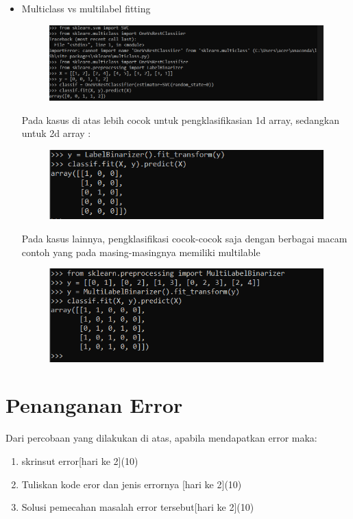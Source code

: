 \begin{enumerate}
\begin{itemize}
\begin{figure}[!htbp]
        \label{Figure}
        \end{figure}
        \newpage
        \item Multiclass vs multilabel fitting
         \begin{figure}[!htbp]
        \centering
        \includegraphics[scale=0.7]{figures/Conventions/11.PNG}
        \label{Figure}
        \end{figure}
        \par
        Pada kasus di atas lebih cocok untuk pengklasifikasian 1d array, sedangkan untuk 2d array :
         \begin{figure}[!htbp]
        \centering
        \includegraphics[scale=1]{figures/Conventions/12.PNG}
        \label{Figure}
        \end{figure}
        \par
        Pada kasus lainnya, pengklasifikasi cocok-cocok saja dengan berbagai macam contoh yang pada masing-masingnya memiliki multilable
        \begin{figure}[!htbp]
        \centering
        \includegraphics[scale=1]{figures/Conventions/13.PNG}
        \label{Figure}
        \end{figure}
        \par
    \end{itemize}
\end{enumerate}
\section{ Penanganan Error}
\par
Dari percobaan yang dilakukan di atas, apabila mendapatkan error maka:
\begin{enumerate}
    \item skrinsut error[hari ke 2](10)
    \item Tuliskan kode eror dan jenis errornya [hari ke 2](10)
    \item Solusi pemecahan masalah error tersebut[hari ke 2](10)
\end{enumerate}
